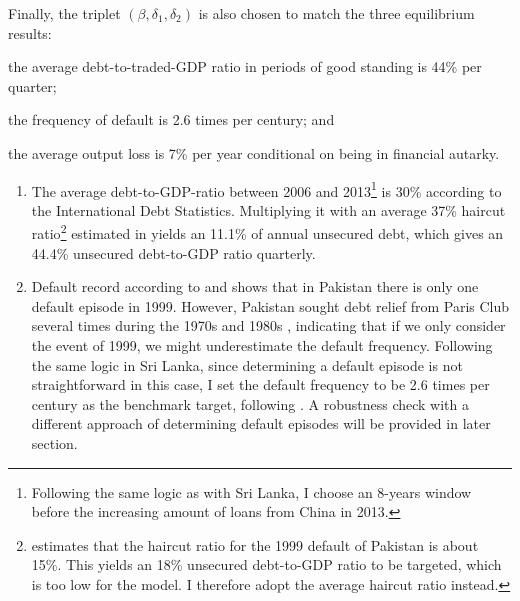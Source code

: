 Finally, the triplet $\left( \beta, \delta_1, \delta_2 \right)$ is also chosen to match the three equilibrium results:
\begin{enumerate*}[label = (\roman*)]
    \item the average debt-to-traded-GDP ratio in periods of good standing is 44\% per quarter;
    \item the frequency of default is 2.6 times per century; and
    \item the average output loss is 7\% per year conditional on being in financial autarky.
\end{enumerate*}
\begin{enumerate}[label = (\roman*)]
    \item
    The average debt-to-GDP-ratio between 2006 and 2013\footnote{
    Following the same logic as with Sri Lanka, I choose an 8-years window before the increasing amount of loans from China in 2013.}
    is 30\% according to the International Debt Statistics. Multiplying it with an average 37\% haircut ratio\footnote{\citet{Cruces-Trebesch-13} estimates that the haircut ratio for the 1999 default of Pakistan is about 15\%. This yields an 18\% unsecured debt-to-GDP ratio to be targeted, which is too low for the model. I therefore adopt the average haircut ratio instead.} estimated in \citet{Cruces-Trebesch-13} yields an 11.1\% of annual unsecured debt, which gives an 44.4\% unsecured debt-to-GDP ratio quarterly.
    \item Default record according to \citet{SPGlobal-default-report} and \citet{Uribe-Schmitt-Grohe-textbook} shows that in Pakistan there is only one default episode in 1999. However, Pakistan sought debt relief from Paris Club several times during the 1970s and 1980s \citep{pakistan-default-start}, indicating that if we only consider the event of 1999, we might underestimate the default frequency\footnotemark{}. Following the same logic in Sri Lanka, since determining a default episode is not straightforward in this case, I set the default frequency to be 2.6 times per century as the benchmark target, following \citet{Na-18}. A robustness check with a different approach of determining default episodes will be provided in later section.
\end{enumerate}

